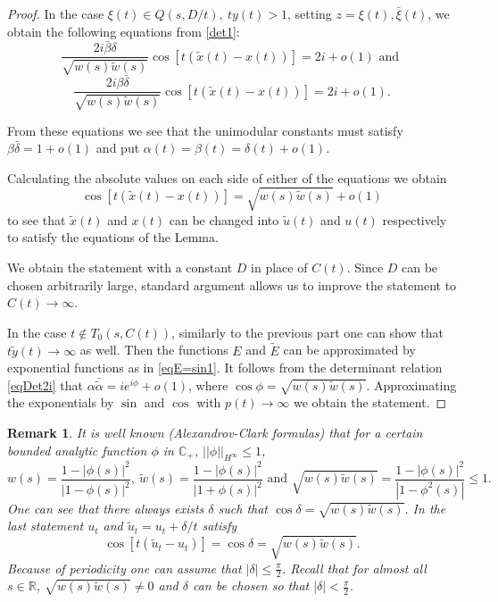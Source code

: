 \documentclass[11pt,twoside,reqno]{amsart}
\def\ti{\tilde}
\def\to{\rightarrow}
\def\R{{\mathbb R}}
\def\C{{\mathbb{C}}}
\def\d{\delta}
\def\a{\alpha}
\def\b{\beta}
\theoremstyle{plain}
\newtheorem{remark}{Remark}
\numberwithin{equation}{section}
\begin{document}
\begin{proof}
In the case $\xi(t)\in Q(s,D/t),\ ty(t)>1$, setting $z= \xi(t), \bar\xi(t)$, we obtain the following  equations from \eqref{det1}:
$$\frac {2i\bar\b\d}{\sqrt{w(s)\ti w(s)}}\cos [t( \ti x(t)-x(t))]=2i + o(1)\textrm{ and }
$$
$$\frac {2i\b\bar\d}{\sqrt{w(s)\ti w(s)}}\cos [t( \ti x(t)-x(t))]=2i +o(1).
$$

From these equations we see that the unimodular constants must satisfy $\b\bar\d=1+o(1)$
and put
$\a(t)=\b(t)=\d(t)+o(1)$.



Calculating the absolute values on each side of either
of the equations we obtain
$$\cos [t(\ti x(t)-x(t))]=\sqrt{w(s)\ti w(s)}+o(1)
$$
to see that $\ti x(t)$ and $x(t)$ can be changed into $\ti u(t)$ and $u(t)$ respectively to satisfy the equations of the Lemma.

We obtain the statement with a constant $D$ in place of $C(t)$. Since $D$ can be chosen arbitrarily large, standard argument allows us
to improve the statement to $C(t)\to\infty$.

In the case $t\not \in  T_0(s,C(t))$, similarly to the previous part one can show that $t\ti y(t)\to\infty$ as well. Then the functions $E$ and $\ti E$ can be approximated by exponential
functions as in \eqref{eqE=sin1}. It follows from the determinant relation \eqref{eqDet2i} that
$\a\bar{\ti\a}=ie^{i\phi}+o(1)$, where $\cos \phi=\sqrt{w(s)\ti w(s)}$. Approximating the exponentials
by $\sin$ and $\cos$ with $p(t)\to\infty$ we obtain the statement.
\end{proof}

\begin{remark}\label{remAC}
It is well known (Alexandrov-Clark formulas) that for a certain bounded analytic function $\phi$ in $\C_+$, $||\phi||_{H^\infty}\leq 1$,
$$w(s)=\frac{1-|\phi(s)|^2}{|1-\phi(s)|^2}, \ \ti w(s)=\frac{1-|\phi(s)|^2}{|1+\phi(s)|^2}\textrm{ and }\sqrt{w(s)\ti w(s)}=\frac{1-|\phi(s)|^2}{|1-\phi^2(s)|}\leq 1.$$
One can see that there always exists  $\d$ such that $\cos\d = \sqrt{w(s)\ti w(s)}$.
In the last statement $u_t$ and $\ti u_t=u_t+\d/t$ satisfy $$\cos [t(\ti u_t-u_t)]=\cos\d=\sqrt{w(s)\ti w(s)}.$$
Because of periodicity one can assume that $|\d|\leq \frac \pi 2$.
Recall that for almost all $s\in\R$, $\sqrt{w(s)\ti w(s)}\neq 0$ and $\d$ can be chosen so that $|\d|< \frac \pi 2$.
\end{remark}
\end{document}
